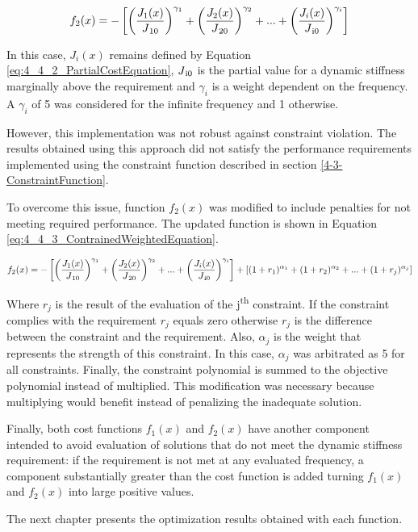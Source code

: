 \begin{equation}
\label{eq:4_4_2_WeightedEquation}
f_2(x) = - \left[\left(\frac{J_1(x)}{J\textsubscript{10}} \right)^{\gamma_1} + 
		         \left(\frac{J_2(x)}{J\textsubscript{20}} \right)^{\gamma_2} + ... + 
		    	 \left(\frac{J_i(x)}{J\textsubscript{i0}} \right)^{\gamma_i}\right]
\end{equation}

In this case, $J_i(x)$ remains defined by Equation \ref{eq:4_4_2_PartialCostEquation}, $J\textsubscript{i0}$ is the partial value for a dynamic stiffness marginally above the requirement and $\gamma_i$ is a weight dependent on the frequency. A $\gamma_i$ of 5 was considered for the infinite frequency and 1 otherwise.

However, this implementation was not robust against constraint violation. The results obtained using this approach did not satisfy the performance requirements implemented using the constraint function described in section \ref{4-3-ConstraintFunction}.

To overcome this issue, function $f_2(x)$ was modified to include penalties for not meeting required performance. The updated function is shown in Equation \ref{eq:4_4_3_ContrainedWeightedEquation}.

\begin{equation}
\label{eq:4_4_3_ContrainedWeightedEquation}
f_2(x) = - \left[\left( \frac{J_1(x)}{J\textsubscript{10}} \right)^{\gamma_1} + 
		    	 \left( \frac{J_2(x)}{J\textsubscript{20}} \right)^{\gamma_2} + ... + 
		    	 \left( \frac{J_i(x)}{J\textsubscript{i0}} \right)^{\gamma_i} \right]+
		 	 	 [(1+r_1)^{\alpha_1} + (1+r_2)^{\alpha_2} + ... + (1+r_j)^{\alpha_j}]
\end{equation}

Where $r_j$ is the result of the evaluation of the j\textsuperscript{th} constraint. If the constraint complies with the requirement $r_j$ equals zero otherwise $r_j$ is the difference between the constraint and the requirement. Also, $\alpha_j$ is the weight that represents the strength of this constraint. In this case, $\alpha_j$ was arbitrated as 5 for all constraints. Finally, the constraint polynomial is summed to the objective polynomial instead of multiplied. This modification was necessary because multiplying would benefit instead of penalizing the inadequate solution.

Finally, both cost functions $f_1(x)$ and $f_2(x)$ have another component intended to avoid evaluation of solutions that do not meet the dynamic stiffness requirement: if the requirement is not met at any evaluated frequency, a component substantially greater than the cost function is added turning $f_1(x)$ and $f_2(x)$ into large positive values.

The next chapter presents the optimization results obtained with each function.